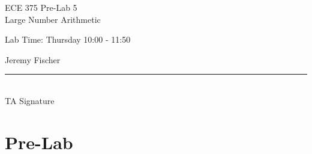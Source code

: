 \documentclass[12pt,letterpaper]{article}
\begin{document}
\begin{titlepage}
    \vspace*{4cm}
    \begin{flushright}
    {\huge
        ECE 375 Pre-Lab 5\\[1cm]
    }
    {\large
     	Large Number Arithmetic
    }
    \end{flushright}
    \begin{flushleft}
    Lab Time: Thursday 10:00 - 11:50
    \end{flushleft}
    \begin{flushright}
    Jeremy Fischer
    
    \vfill
    \rule{5in}{.5mm}\\
    TA Signature
    \end{flushright}

\end{titlepage}


\section{Pre-Lab}
\end{document}
